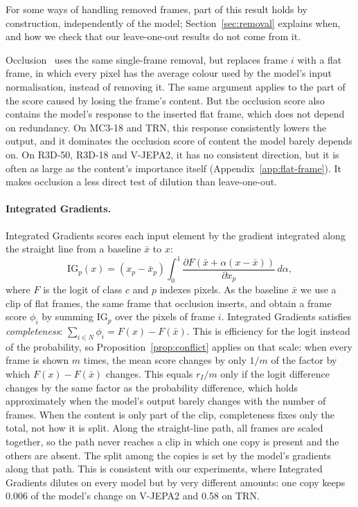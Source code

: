 For some ways of handling removed frames, part of this result holds by construction, independently of the model; Section~\ref{sec:removal} explains when, and how we check that our leave-one-out results do not come from it.

Occlusion~\citep{matthew_d__zeiler_d7ae7e07} uses the same single-frame removal, but replaces frame $i$ with a flat frame, in which every pixel has the average colour used by the model's input normalisation, instead of removing it.
The same argument applies to the part of the score caused by losing the frame's content.
But the occlusion score also contains the model's response to the inserted flat frame, which does not depend on redundancy.
On MC3-18 and TRN, this response consistently lowers the output, and it dominates the occlusion score of content the model barely depends on. On R3D-50, R3D-18 and V-JEPA2, it has no consistent direction, but it is often as large as the content's importance itself (Appendix~\ref{app:flat-frame}).
It makes occlusion a less direct test of dilution than leave-one-out.

\paragraph{Integrated Gradients.}
Integrated Gradients scores each input element by the gradient integrated along the straight line from a baseline $\bar{x}$ to $x$:
\begin{equation}
  \mathrm{IG}_p(x) = (x_p - \bar{x}_p) \int_0^1 \frac{\partial F(\bar{x} + \alpha (x - \bar{x}))}{\partial x_p}\, d\alpha ,
\end{equation}
where $F$ is the logit of class $c$ and $p$ indexes pixels.
As the baseline $\bar{x}$ we use a clip of flat frames, the same frame that occlusion inserts, and obtain a frame score $\phi_i$ by summing $\mathrm{IG}_p$ over the pixels of frame $i$.
Integrated Gradients satisfies \emph{completeness}: $\sum_{i \in N} \phi_i = F(x) - F(\bar{x})$.
This is efficiency for the logit instead of the probability, so Proposition~\ref{prop:conflict} applies on that scale: when every frame is shown $m$ times, the mean score changes by only $1/m$ of the factor by which $F(x) - F(\bar{x})$ changes.
This equals $r_I / m$ only if the logit difference changes by the same factor as the probability difference, which holds approximately when the model's output barely changes with the number of frames.
When the content is only part of the clip, completeness fixes only the total, not how it is split.
Along the straight-line path, all frames are scaled together, so the path never reaches a clip in which one copy is present and the others are absent.
The split among the copies is set by the model's gradients along that path.
This is consistent with our experiments, where Integrated Gradients dilutes on every model but by very different amounts: one copy keeps 0.006 of the model's change on V-JEPA2 and 0.58 on TRN.

